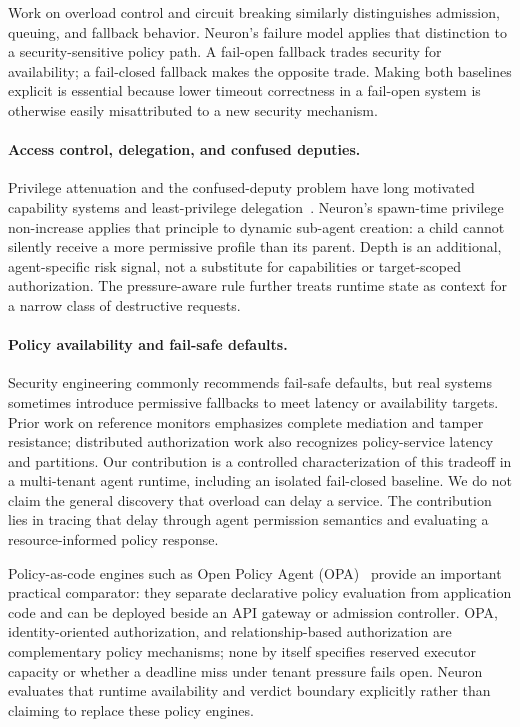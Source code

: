 Work on overload control and circuit breaking similarly distinguishes
admission, queuing, and fallback behavior. Neuron's failure model applies
that distinction to a security-sensitive policy path. A fail-open fallback
trades security for availability; a fail-closed fallback makes the opposite
trade. Making both baselines explicit is essential because lower timeout
correctness in a fail-open system is otherwise easily misattributed to a new
security mechanism.

\paragraph{Access control, delegation, and confused deputies.}
Privilege attenuation and the confused-deputy problem have long motivated
capability systems and least-privilege delegation~\cite{hardy1988confused}.
Neuron's spawn-time privilege non-increase applies that principle to dynamic
sub-agent creation: a child cannot silently receive a more permissive
profile than its parent. Depth is an additional, agent-specific risk signal,
not a substitute for capabilities or target-scoped authorization. The
pressure-aware rule further treats runtime state as context for a narrow
class of destructive requests.

\paragraph{Policy availability and fail-safe defaults.}
Security engineering commonly recommends fail-safe defaults, but real
systems sometimes introduce permissive fallbacks to meet latency or
availability targets. Prior work on reference monitors emphasizes complete
mediation and tamper resistance; distributed authorization work also
recognizes policy-service latency and partitions. Our contribution is a
controlled characterization of this tradeoff in a multi-tenant agent
runtime, including an isolated fail-closed baseline. We do not claim the
general discovery that overload can delay a service. The contribution lies
in tracing that delay through agent permission semantics and evaluating a
resource-informed policy response.

Policy-as-code engines such as Open Policy Agent (OPA)~\cite{opa2024} provide
an important practical comparator: they separate declarative policy evaluation
from application code and can be deployed beside an API gateway or admission
controller. OPA, identity-oriented authorization, and relationship-based
authorization are complementary policy mechanisms; none by itself specifies
reserved executor capacity or whether a deadline miss under tenant pressure
fails open. Neuron evaluates that runtime availability and verdict boundary
explicitly rather than claiming to replace these policy engines.

